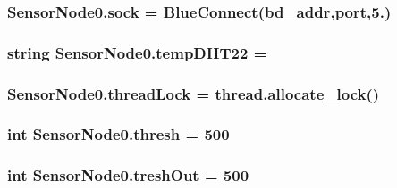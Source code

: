 \subsubsection[{\texorpdfstring{sock}{sock}}]{\setlength{\rightskip}{0pt plus 5cm}Sensor\+Node0.\+sock = Blue\+Connect({\bf bd\+\_\+addr},{\bf port},5.)}\hypertarget{namespaceSensorNode0_a6b4baa40941946967bba9f0a8b1d414b}{}\label{namespaceSensorNode0_a6b4baa40941946967bba9f0a8b1d414b}
\subsubsection[{\texorpdfstring{temp\+D\+H\+T22}{tempDHT22}}]{\setlength{\rightskip}{0pt plus 5cm}string Sensor\+Node0.\+temp\+D\+H\+T22 = \textquotesingle{}\textquotesingle{}}\hypertarget{namespaceSensorNode0_ae6cff13e6146160841c5249c19e8e8c7}{}\label{namespaceSensorNode0_ae6cff13e6146160841c5249c19e8e8c7}
\subsubsection[{\texorpdfstring{thread\+Lock}{threadLock}}]{\setlength{\rightskip}{0pt plus 5cm}Sensor\+Node0.\+thread\+Lock = thread.\+allocate\+\_\+lock()}\hypertarget{namespaceSensorNode0_ac28b0dfb61cb44c2075c9f10cc918c72}{}\label{namespaceSensorNode0_ac28b0dfb61cb44c2075c9f10cc918c72}
\subsubsection[{\texorpdfstring{thresh}{thresh}}]{\setlength{\rightskip}{0pt plus 5cm}int Sensor\+Node0.\+thresh = 500}\hypertarget{namespaceSensorNode0_affd806dd0b5faa586b60d239832a60b3}{}\label{namespaceSensorNode0_affd806dd0b5faa586b60d239832a60b3}
\subsubsection[{\texorpdfstring{tresh\+Out}{treshOut}}]{\setlength{\rightskip}{0pt plus 5cm}int Sensor\+Node0.\+tresh\+Out = 500}\hypertarget{namespaceSensorNode0_a8b1d695d3a341a34667a220af9c25ce4}{}\label{namespaceSensorNode0_a8b1d695d3a341a34667a220af9c25ce4}
